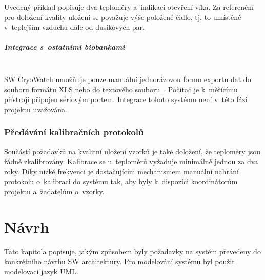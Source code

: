 \documentclass[11pt, final, oneside]{fithesis2}
\newcommand{\paragraphNewLine}[1]{\paragraph*{#1}\mbox{}\\}
\begin{document}
Uvedený příklad popisuje dva teploměry a~indikaci otevření víka. Za referenční pro doložení kvality uložení se považuje výše položené čidlo, tj. to umístěné v~teplejším vzduchu dále od dusíkových par. 

\paragraphNewLine{Integrace s~ostatními biobankami}
SW CryoWatch umožňuje pouze manuální jednorázovou formu exportu dat do souboru formátu XLS nebo do textového souboru~\cite{M355CE}. Počítač je k~měřícímu přístroji připojen sériovým portem. Integrace tohoto systému není v~této fázi projektu uvažována. 

\subsection{Předávání kalibračních protokolů}
Součástí požadavků na kvalitní uložení vzorků je také doložení, že teploměry jsou řádně zkalibrovány. Kalibrace se u~teploměrů vyžaduje minimálně jednou za dva roky. Díky nízké frekvenci je dostačujícím mechanismem manuální nahrání protokolu o~kalibraci do systému tak, aby byly k~dispozici koordinátorům projektu a~žadatelům o~vzorky.




\chapter{Návrh}\label{chapter:proposal}
Tato kapitola popisuje, jakým způsobem byly požadavky na systém převedeny do konkrétního návrhu SW architektury. Pro modelování systému byl použit modelovací jazyk UML.

\end{document}
